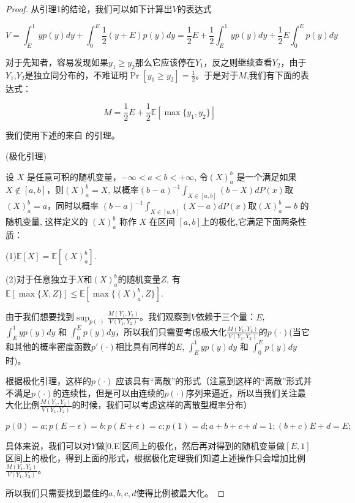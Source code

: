 \documentclass[bachelor]{thuthesis}
\begin{document}
\begin{proof}

从引理1的结论，我们可以如下计算出$V$的表达式

\[V=\int_{E}^{1} yp(y)dy+\int_{0}^{E} \frac{1}{2}(y+E)p(y)dy=\frac{1}{2}E+\frac{1}{2}\int_{E}^{1} yp(y)dy+\frac{1}{2}E\int_{0}^{E} p(y)dy\]

对于先知者，容易发现如果$y_1\ge y_2$那么它应该停在$Y_1$，反之则继续查看$Y_2$，由于$Y_1$,$Y_2$是独立同分布的，不难证明$\Pr[y_1\ge y_2]=\frac{1}{2}$。于是对于$M$,我们有下面的表达式：

\[M=\frac{1}{2}E+\frac{1}{2}\mathbb{E}[\max\{y_1,y_2\}]\]

我们使用下述的来自
\cite{prophet}
的引理。

\begin{lemma}(极化引理)

设 $X$ 是任意可积的随机变量，$-\infty<a<b<+\infty$, 令$(X)_a^b$ 是一个满足如果$X\notin [a,b]$，则$(X)_a^b=X$, 以概率$(b-a)^{-1}\int_{X\in [a,b]}(b-X)dP(x)$取 $(X)_a^b=a$，同时以概率 $(b-a)^{-1}\int_{X\in [a,b]}(X-a)dP(x)$取$(X)_a^b=b$ 的随机变量, 这样定义的 $(X)_a^b$ 称作 $X$ 在区间 $[a,b]$上的极化,它满足下面两条性质：

(1)$\mathbb{E}[X]=\mathbb{E}[(X)_a^b]$.

(2)对于任意独立于$X$和$(X)_a^b$的随机变量$Z$, 有$\mathbb{E}[\max\{X,Z\}]\le \mathbb{E}[\max\{(X)_a^b,Z\}]$.

\end{lemma}

由于我们想要找到$\sup_{p(\cdot)}\frac{M(Y_1,Y_2)}{V(Y_1,Y_2)}$。我们观察到$V$依赖于三个量：$E$, $\int_{E}^{1} yp(y)dy$ 和 $\int_{0}^{E} p(y)dy$，所以我们只需要考虑极大化$\frac{M(Y_1,Y_2)}{V(Y_1,Y_2)}$的$p(\cdot)$(当它和其他的概率密度函数$p'(\cdot)$相比具有同样的$E$, $\int_{E}^{1} yp(y)dy$ 和 $\int_{0}^{E} p(y)dy$时)。

根据极化引理，这样的$p(\cdot)$ 应该具有“离散”的形式（注意到这样的“离散”形式并不满足$p(\cdot)$的连续性，但是可以由连续的$p(\cdot)$序列来逼近，所以当我们关注最大化比例$\frac{M(Y_1,Y_2)}{V(Y_1,Y_2)}$的时候，我们可以考虑这样的离散型概率分布）

\[p(0)=a;p(E-\epsilon)=b;p(E+\epsilon)=c;p(1)=d; a+b+c+d=1; (b+c)E+d=E;\]

具体来说，我们可以对$Y$做[0,E]区间上的极化，然后再对得到的随机变量做$[E,1]$区间上的极化，得到上面的形式，根据极化定理我们知道上述操作只会增加比例$\frac{M(Y_1,Y_2)}{V(Y_1,Y_2)}$。

所以我们只需要找到最佳的$a,b,c,d$使得比例被最大化。


\end{proof}
\end{document}
